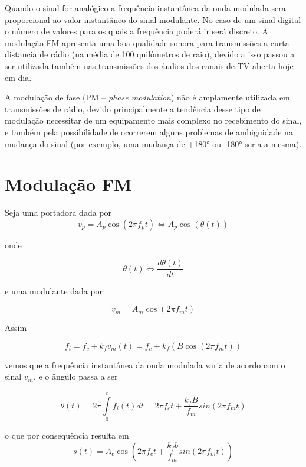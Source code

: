 \documentclass[]{report}
\begin{document}
Quando o sinal for analógico a frequência instantânea da onda modulada sera proporcional ao valor instantâneo do sinal modulante. No caso de um sinal digital o número de valores para os quais a frequência poderá ir será discreto.	A modulação FM apresenta uma boa qualidade sonora para transmissões a curta distancia de rádio (na média de 100 quilômetros de raio), devido a isso passou a ser utilizada também nas transmissões dos áudios dos canais de TV aberta hoje em dia.

A modulação de fase (PM – \textit{phase modulation}) não é amplamente utilizada em transmissões de rádio, devido principalmente a tendência desse tipo de modulação necessitar de um equipamento mais complexo no recebimento do sinal, e também pela possibilidade de ocorrerem alguns problemas de ambiguidade na mudança do sinal (por exemplo, uma mudança de +180° ou -180° seria a mesma).


\section{Modulação FM}

Seja uma portadora dada por
\begin{equation}
v_p = A_p \cos(2 \pi f_p t) \Leftrightarrow A_p  \cos(\theta(t))
\end{equation}

onde

\begin{equation}
\theta(t)  \Leftrightarrow \frac{d \theta(t)}{dt}
\end{equation}

e uma modulante dada por

\begin{equation}
v_m = A_m \cos(2 \pi f_m t)
\end{equation}
	
Assim

\begin{equation}
f_i = f_c + k_f v_m(t) = f_c + k_f (B \cos(2\pi f_m t) )
\end{equation}

vemos que a frequência instantânea da onda modulada varia de acordo com o sinal $v_m$, e o ângulo passa a ser

\begin{equation}
\theta(t) = 2 \pi \int\limits_{0}^{t} f_i(t) dt = 2 \pi f_c t + \frac{k_f B}{f_m} sin(2\pi f_m t)
\end{equation}


o que por consequência resulta em
\begin{equation}
s(t)= A_c \cos(2 \pi f_c t + \frac{k_f b}{f_m} sin(2\pi f_m t))
\end{equation}
\end{document}

